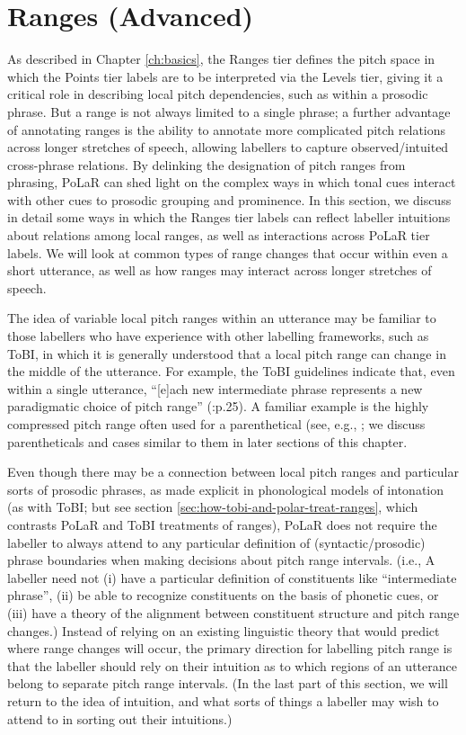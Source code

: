 \documentclass[11pt, twoside]{memoir}
\begin{document}
\section{Ranges (Advanced)}\label{sec:ranges-advanced}

As described in Chapter \ref{ch:basics}, the Ranges tier defines the pitch space in which the Points tier labels are to be interpreted via the Levels tier, giving it a critical role in describing local pitch dependencies, such as within a prosodic phrase. But a range is not always limited to a single phrase; a further advantage of annotating ranges is the ability to annotate more complicated pitch relations across longer stretches of speech, allowing labellers to capture observed\slash intuited cross-phrase relations. By delinking the designation of pitch ranges from phrasing, PoLaR can shed light on the complex ways in which tonal cues interact with other cues to prosodic grouping and prominence. In this section, we discuss in detail some ways in which the Ranges tier labels can reflect labeller intuitions about relations among local ranges, as well as interactions across PoLaR tier labels. We will look at common types of range changes that occur within even a short utterance, as well as how ranges may interact across longer stretches of speech.

The idea of variable local pitch ranges within an utterance may be familiar to those labellers who have experience with other labelling frameworks, such as ToBI, in which it is generally understood that a local pitch range can change in the middle of the utterance. For example, the ToBI guidelines indicate that, even within a single utterance, “[e]ach new intermediate phrase represents a new paradigmatic choice of pitch range” (\citealt{beckmanayers97}:p.25). A familiar example is the highly compressed pitch range often used for a parenthetical (see, e.g., \citealt{dehewichmann10}; we discuss parentheticals and cases similar to them in later sections of this chapter.

Even though there may be a connection between local pitch ranges and particular sorts of prosodic phrases, as made explicit in phonological models of intonation (as with ToBI; but see section \ref{sec:how-tobi-and-polar-treat-ranges}, which contrasts PoLaR and ToBI treatments of ranges), PoLaR does not require the labeller to always attend to any particular definition of (syntactic\slash prosodic) phrase boundaries when making decisions about pitch range intervals. (i.e., A labeller need not (i) have a particular definition of constituents like “intermediate phrase”, (ii) be able to recognize constituents on the basis of phonetic cues, or (iii) have a theory of the alignment between constituent structure and pitch range changes.) Instead of relying on an existing linguistic theory that would predict where range changes will occur, the primary direction for labelling pitch range is that the labeller should rely on their intuition as to which regions of an utterance belong to separate pitch range intervals. (In the last part of this section, we will return to the idea of intuition, and what sorts of things a labeller may wish to attend to in sorting out their intuitions.)
\end{document}
